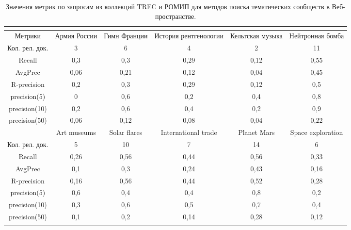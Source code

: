 \begin{table}[ht]%
	\centering
	\caption{Значения метрик по запросам из коллекций TREC и РОМИП для методов поиска тематических сообществ в Веб-пространстве.}%
	\label{tab:metricsROMIPTREC}%
	\begin{adjustbox}{width=0.9\textwidth}
		\small
		\begin{tabular}{ c  c  c  c  c  c }%
			\toprule
			\\
			\hline
			Метрики & Армия России & Гимн Франции & История рентгенологии &  Кельтская музыка &  Нейтронная бомба \\
			\hline
			Кол. рел. док. & 3 & 6 & 4 & 2 & 11  \\
			Recall & 0,3 & 0,3 & 0,29 & 0,12 & 0,55 \\
			AvgPrec & 0,06 & 0,21 & 0,12 & 0,04 & 0,45  \\
			R-precision & 0,2 & 0,3 & 0,29 & 0,12 & 0,5  \\
			precision(5) & 0 & 0,6 & 0,2 & 0,4 & 0,8  \\
			precision(10) & 0,2 & 0,6 & 0,4 & 0,2 & 0,9  \\
			precision(50) & 0,06 & 0,12 & 0,08 & 0,04 & 0,22  \\
			\hline
			& Art museums & Solar flares & International trade &  Planet Mars &  Space exploration \\
			\hline
			Кол. рел. док. & 5 & 10 & 7 & 14 & 6  \\
			Recall & 0,26 & 0,56 & 0,44 & 0,56 & 0,33 \\
			AvgPrec & 0,1 & 0,3 & 0,24 & 0,43 & 0,16  \\
			R-precision & 0,16 & 0,56 & 0,44 & 0,52 & 0,28  \\
			precision(5) & 0,6 & 0,4 & 0,4 & 0,8 & 0,2  \\
			precision(10) & 0,3 & 0,6 & 0,5 & 0,7 & 0,4  \\
			precision(50) & 0,1 & 0,2 & 0,14 & 0,28 & 0,12  \\
			\hline
			\\

\end{tabular}
\end{adjustbox}
\end{table}
